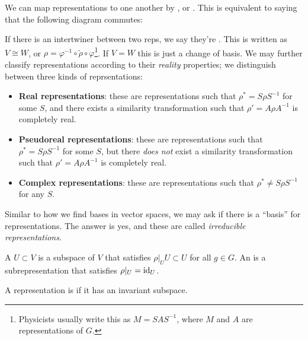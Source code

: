 \documentclass[11pt]{article}
\begin{document}
We can map representations to one another by , or . This is equivalent to
saying that the following diagram commutes:
\begin{center}
\end{center}
If there is an intertwiner between two reps, we say they're 
. This is written as $V \cong W$, or 
$\rho = \varphi^{-1} \circ \widetilde{\rho} \circ \varphi$\footnote{Physicists
usually write this as $M = S A S^{-1}$, where $M$ and $A$ are representations
of $G$.}. If $V = W$ this is just a change of basis. We may further classify
representations according to their \emph{reality} properties; we
distinguish between three kinds of reprsentations:
\begin{itemize}
    \item \textbf{Real representations}: these are representations
    such that $\rho^* = S \rho S^{-1}$ for some $S$, and there exists
    a similarity transformation such that $\rho' = A \rho A^{-1}$ is
    completely real.
    \item \textbf{Pseudoreal representations}: these are representations
    such that $\rho^* = S \rho S^{-1}$ for some $S$, but there \emph{does not}
    exist a similarity transformation such that $\rho' = A \rho A^{-1}$ is
    completely real.
    \item \textbf{Complex representations}: these are representations
    such that $\rho^* \neq S \rho S^{-1}$ for any $S$.
\end{itemize}






Similar to how we find bases 
in vector spaces, we may ask if there is a ``basis'' for representations. The 
answer is yes, and these are called \emph{irreducible representations}.

\begin{definition}
    A  $U \subset V$ is a subspace
    of $V$ that satisfies $\rho|_U U \subset U$ for all $g \in G$.
    An  is a subrepresentation that
    satisfies $\rho|_U = \operatorname{id}_U$.
\end{definition}

\begin{definition}
    A representation is  if it has an invariant subspace.
\end{definition}
\end{document}
